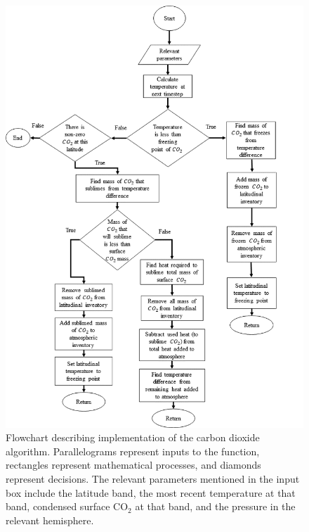 \documentclass[12pt,onecolumn]{revtex4-2}    %
\begin{document}
\begin{figure}
\centering
\includegraphics[width = 15cm]{flowchart2.png}
\caption{Flowchart describing implementation of the carbon dioxide algorithm. Parallelograms represent inputs to the function, rectangles represent mathematical processes, and diamonds represent decisions. The relevant parameters mentioned in the input box include the latitude band, the most recent temperature at that band, condensed surface $\mathrm{CO_2}$ at that band, and the pressure in the relevant hemisphere.}
\label{fig:test}
\end{figure}
\end{document}

